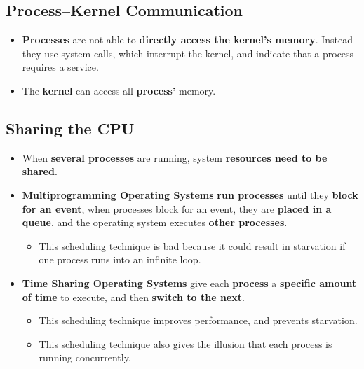 \documentclass{article}
\begin{document}
    \subsection*{Process--Kernel Communication}
    \begin{itemize}
        \item \textbf{Processes} are not able to \textbf{directly access the kernel's memory}. Instead they use system calls, which interrupt the kernel, and indicate that a process requires a service.
        \item The \textbf{kernel} can access all \textbf{process'} memory.
    \end{itemize}

    \subsection*{Sharing the CPU}
    \begin{itemize}
        \item When \textbf{several processes} are running, system \textbf{resources need to be shared}.
        \item \textbf{Multiprogramming Operating Systems} \textbf{run processes} until they \textbf{block for an event}, when processes block for an event, they are \textbf{placed in a queue}, and the operating system executes \textbf{other processes}.
        \begin{itemize}
            \item This scheduling technique is bad because it could result in starvation if one process runs into an infinite loop.
        \end{itemize}
        \item \textbf{Time Sharing Operating Systems} give each \textbf{process} a \textbf{specific amount of time} to execute, and then \textbf{switch to the next}.
        \begin{itemize}
            \item This scheduling technique improves performance, and prevents starvation.
            \item This scheduling technique also gives the illusion that each process is running concurrently.
        \end{itemize}
    \end{itemize}
\end{document}
